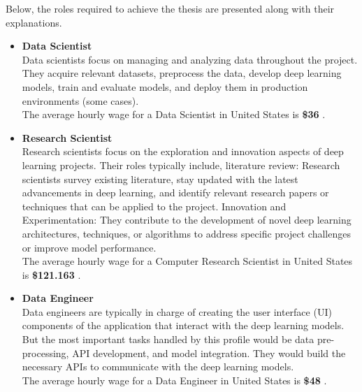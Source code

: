 Below, the roles required to achieve the thesis are presented along with their explanations. \\

\begin{itemize}
    \item \textbf{Data Scientist} \\
    
Data scientists focus on managing and analyzing data throughout the project. They acquire relevant datasets, preprocess the data, develop deep learning models, train and evaluate models, and deploy them in production environments (some cases). \\

The average hourly wage for a Data Scientist in United States is \textbf{\$36} \cite{SalaryDataScientist}. \\

\item \textbf{Research Scientist} \\
    
Research scientists focus on the exploration and innovation aspects of deep learning projects. Their roles typically include, literature review: Research scientists survey existing literature, stay updated with the latest advancements in deep learning, and identify relevant research papers or techniques that can be applied to the project. Innovation and Experimentation: They contribute to the development of novel deep learning architectures, techniques, or algorithms to address specific project challenges or improve model performance. \\

The average hourly wage for a Computer Research Scientist in United States is \textbf{\$121.163} \cite{SalaryResearchScientist}. \\

\item \textbf{Data Engineer} \\
    
Data engineers are typically in charge of creating the user interface (UI) components of the application that interact with the deep learning models. But the most important tasks handled by this profile would be data pre-processing, API development, and model integration. They would build the necessary APIs to communicate with the deep learning models. \\

The average hourly wage for a Data Engineer in United States is \textbf{\$48} \cite{SalaryDataEnginner}. \\

\end{itemize}

